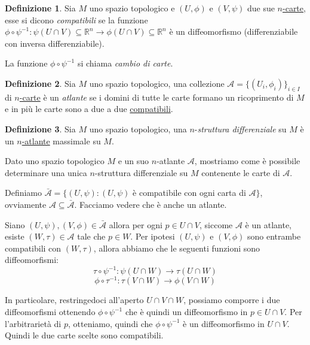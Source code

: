 \documentclass[12pt, a4paper]{article}
\theoremstyle{definition}
\newtheorem{defi}{Definizione}
\begin{document}
\begin{defi} \label{def:carte-compatibili}
Sia $M$ uno spazio topologico e $(U, \phi)$ e $(V, \psi)$ due sue \hyperref[def:carta]{$n$-carte}, esse si dicono \emph{compatibili} se la funzione
$\phi \circ \psi^{-1} : \psi(U \cap V) \subseteq \mathbb{R}^n \to \phi(U \cap V) \subseteq \mathbb{R}^n$
è un diffeomorfismo (differenziabile con inversa differenziabile).

La funzione $\phi \circ \psi^{-1}$ si chiama \emph{cambio di carte}.
\end{defi}

\begin{defi} \label{def:atlante}
Sia $M$ uno spazio topologico, una collezione $\mathcal{A} = \{(U_i, \phi_i)\}_{i \in I}$ di \hyperref[def:carta]{$n$-carte} è un \emph{atlante} se i domini di tutte le carte
formano un ricoprimento di $M$ e in più le carte sono a due a due \hyperref[def:carte-compatibili]{compatibili}.
\end{defi}

\begin{defi} \label{def:struttura-differenziale}
Sia $M$ uno spazio topologico, una $n$-\emph{struttura differenziale} su $M$ è un \hyperref[def:atlante]{$n$-atlante} massimale su $M$.
\end{defi}

Dato uno spazio topologico $M$ e un suo $n$-atlante $\mathcal{A}$, mostriamo come è possibile determinare una unica $n$-struttura differenziale su $M$ contenente le carte di $\mathcal{A}$.

Definiamo $\mathcal{\bar{A}} = \{ (U, \psi) : (U, \psi)$ è compatibile con ogni carta di $\mathcal{A} \}$, ovviamente $\mathcal{A} \subseteq \mathcal{\bar{A}}$. Facciamo vedere che è anche un atlante.

Siano $(U, \psi), (V, \phi) \in \mathcal{\bar{A}}$ allora per ogni $p \in U \cap V$, siccome $\mathcal{A}$ è un atlante, esiste $(W, \tau) \in \mathcal{A}$ tale che $p \in W$.
Per ipotesi $(U, \psi)$ e $(V, \phi)$ sono entrambe compatibili con $(W, \tau)$, allora abbiamo che le seguenti funzioni sono diffeomorfismi:
$$\tau \circ \psi^{-1} : \psi(U \cap W) \to \tau(U \cap W)$$
$$\phi \circ \tau^{-1} : \tau(V \cap W) \to \phi(V \cap W)$$

In particolare, restringedoci all'aperto $U \cap V \cap W$, possiamo comporre i due diffeomorfismi ottenendo $\phi \circ \psi^{-1}$ che è quindi un diffeomorfismo in $p \in U \cap V$.
Per l'arbitrarietà di $p$, otteniamo, quindi che $\phi \circ \psi^{-1}$ è un diffeomorfismo in $U \cap V$. Quindi le due carte scelte sono compatibili.
\end{document}
